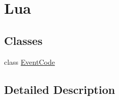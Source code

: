 \hypertarget{group___lua}{}\section{Lua}
\label{group___lua}
\subsection*{Classes}
\begin{DoxyCompactItemize}
\item 
class \hyperlink{class_event_code}{Event\+Code}
\end{DoxyCompactItemize}


\subsection{Detailed Description}
